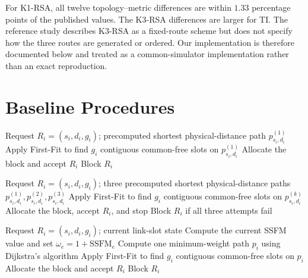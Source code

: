 \documentclass[letterpaper,journal]{IEEEtran}
\begin{document}
For K1-RSA, all twelve topology--metric differences are within
\(1.33\) percentage points of the published values. The K3-RSA differences
are larger for TI. The reference study describes K3-RSA as a fixed-route
scheme but does not specify how the three routes are generated or ordered.
Our implementation is therefore documented below and treated as a
common-simulator implementation rather than an exact reproduction.

\section{Baseline Procedures}

\begin{algorithm}[t]
\caption{Implemented K1-RSA}
\label{alg:supp_k1}
\begin{algorithmic}[1]
\Require Request \(R_i=(s_i,d_i,g_i)\); precomputed shortest
physical-distance path \(p_{s_i,d_i}^{(1)}\)
\State Apply First-Fit to find \(g_i\) contiguous common-free slots on
\(p_{s_i,d_i}^{(1)}\)
    \State Allocate the block and accept \(R_i\)
\Else
    \State Block \(R_i\)
\EndIf
\end{algorithmic}
\end{algorithm}

\begin{algorithm}[t]
\caption{Implemented K3-RSA}
\label{alg:supp_k3}
\begin{algorithmic}[1]
\Require Request \(R_i=(s_i,d_i,g_i)\); three precomputed shortest
physical-distance paths \(p_{s_i,d_i}^{(1)},p_{s_i,d_i}^{(2)},
p_{s_i,d_i}^{(3)}\)
    \State Apply First-Fit to find \(g_i\) contiguous common-free slots on
    \(p_{s_i,d_i}^{(k)}\)
        \State Allocate the block, accept \(R_i\), and stop
    \EndIf
\EndFor
\State Block \(R_i\) if all three attempts fail
\end{algorithmic}
\end{algorithm}

\begin{algorithm}[t]
\caption{Implemented FSA-RSA(SSFM)}
\label{alg:supp_ssfm}
\begin{algorithmic}[1]
\Require Request \(R_i=(s_i,d_i,g_i)\); current link-slot state
    \State Compute the current SSFM value and set
    \(\omega_e=1+\mathrm{SSFM}_e\)
\EndFor
\State Compute one minimum-weight path \(p_i\) using Dijkstra's algorithm
\State Apply First-Fit to find \(g_i\) contiguous common-free slots on
\(p_i\)
    \State Allocate the block and accept \(R_i\)
\Else
    \State Block \(R_i\)
\EndIf
\end{algorithmic}
\end{algorithm}
\end{document}
